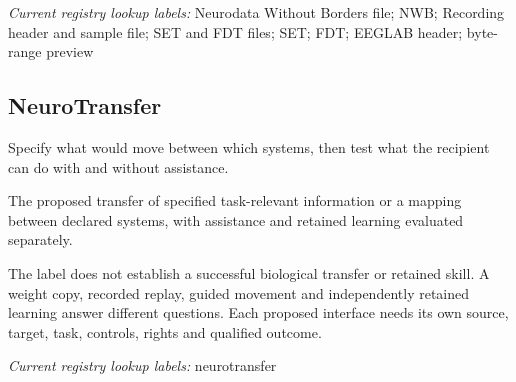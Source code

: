\noindent\textit{Current registry lookup labels:} Neurodata Without Borders file; NWB; Recording header and sample file; SET and FDT files; SET; FDT; EEGLAB header; byte-range preview\par

\begin{samepage}
\subsection*{NeuroTransfer}
\noindent Specify what would move between which systems, then test what the recipient can do with and without assistance.\par
\end{samepage}
\noindent The proposed transfer of specified task-relevant information or a mapping between declared systems, with assistance and retained learning evaluated separately.\par
\begin{samepage}
\noindent The label does not establish a successful biological transfer or retained skill. A weight copy, recorded replay, guided movement and independently retained learning answer different questions. Each proposed interface needs its own source, target, task, controls, rights and qualified outcome.\par\nopagebreak[4]

\end{samepage}


\noindent\textit{Current registry lookup labels:} neurotransfer\par

